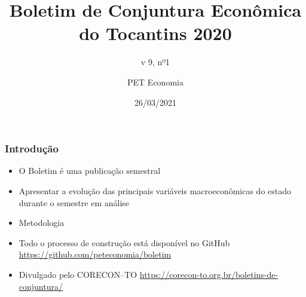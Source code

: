 \documentclass[12pt,aspectratio=169]{beamer}
\title{Boletim de Conjuntura Econômica do Tocantins 2020}
\subtitle{v 9, nº1}
\author{PET Economia}
\institute{Universidade Federal do Tocantins}
\date{26/03/2021}
\begin{document}
\begin{frame}
    \titlepage
\end{frame}


\begin{frame}  
\frametitle{Introdução}
\begin{itemize}
\item O Boletim é uma publicação semestral
\item Apresentar a evolução das principais variáveis macroeconômicas do estado durante o semestre em análise
\item Metodologia
\item Todo o processo de construção está disponível no GitHub \url{https://github.com/peteconomia/boletim}
\item Divulgado pelo CORECON--TO \url{https://corecon-to.org.br/boletins-de-conjuntura/}
\end{itemize}
\end{frame}
\end{document}

